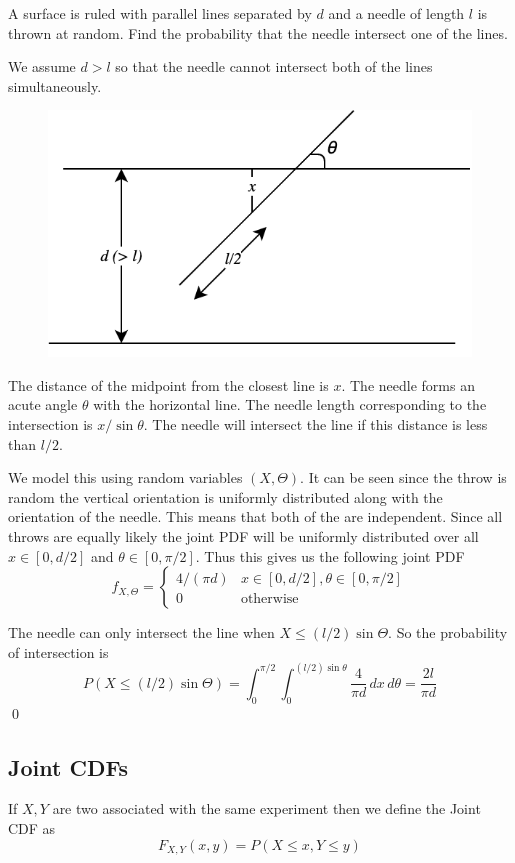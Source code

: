\begin{example}
A surface is ruled with parallel lines separated by $d$ and a needle of length $l$ is thrown at random. Find the probability that the needle intersect one of the lines.


We assume $d > l$ so that the needle cannot intersect both of the lines simultaneously. 

\begin{figure}[h]
    \center
    \includegraphics[width=.4\textwidth]{images/P_buffon_needle.png}
 \end{figure}
 
The distance of the midpoint from the closest line is $x$. The needle forms an acute angle $\theta$ with the horizontal line.  The needle length corresponding to the intersection is $x/\sin \theta$. The needle will intersect the line if this distance is less than $l/2$.

We model this using random variables $(X,\Theta)$. It can be seen since the throw is random the vertical orientation is uniformly distributed along with the orientation of the needle. This means that both of the \rv are independent. Since all throws are equally likely the joint PDF will be uniformly distributed over all $x \in [0, d/2]$ and $\theta \in [0,\pi/2]$. Thus this gives us the following joint PDF
\[f_{X,\Theta}=\begin{cases} 
    4/(\pi d) & x \in [0, d/2], \theta \in [0, \pi/2] \\
    0 & \text{otherwise}
\end{cases}\]

The needle can only intersect the line when $X \le (l/2)\sin \Theta$. So the probability of intersection is 
\[P(X \le (l/2)\sin \Theta) = \int_{0}^{\pi/2}\int_{0}^{(l/2)\sin \theta} \frac{4}{\pi d} \, dx \, d\theta = \frac{2l}{\pi d}\] \qed
\end{example}

\subsection{Joint CDFs}
If $X, Y$ are two \rv associated with the same experiment then we define the Joint CDF as
\[\boxed {F_{X,Y}(x,y) = P(X\le x, Y\le y)}\]

